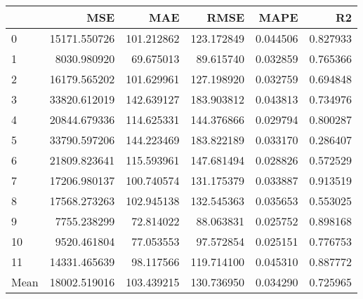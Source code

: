 \begin{tabular}{lrrrrr}
\toprule
 & MSE & MAE & RMSE & MAPE & R2 \\
\midrule
0 & 15171.550726 & 101.212862 & 123.172849 & 0.044506 & 0.827933 \\
1 & 8030.980920 & 69.675013 & 89.615740 & 0.032859 & 0.765366 \\
2 & 16179.565202 & 101.629961 & 127.198920 & 0.032759 & 0.694848 \\
3 & 33820.612019 & 142.639127 & 183.903812 & 0.043813 & 0.734976 \\
4 & 20844.679336 & 114.625331 & 144.376866 & 0.029794 & 0.800287 \\
5 & 33790.597206 & 144.223469 & 183.822189 & 0.033170 & 0.286407 \\
6 & 21809.823641 & 115.593961 & 147.681494 & 0.028826 & 0.572529 \\
7 & 17206.980137 & 100.740574 & 131.175379 & 0.033887 & 0.913519 \\
8 & 17568.273263 & 102.945138 & 132.545363 & 0.035653 & 0.553025 \\
9 & 7755.238299 & 72.814022 & 88.063831 & 0.025752 & 0.898168 \\
10 & 9520.461804 & 77.053553 & 97.572854 & 0.025151 & 0.776753 \\
11 & 14331.465639 & 98.117566 & 119.714100 & 0.045310 & 0.887772 \\
Mean & 18002.519016 & 103.439215 & 130.736950 & 0.034290 & 0.725965 \\
\bottomrule
\end{tabular}

